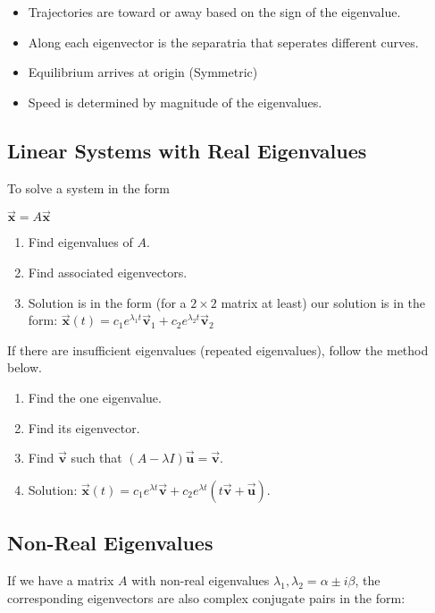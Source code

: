 \documentclass[12pt,landscape,twocolumn]{article}
\let\oldvec\vec
\renewcommand{\vec}[1]{\oldvec{\mathbf{ #1 } } }                    %
\begin{document}
            \begin{itemize}
                \item Trajectories are toward or away based on the sign of the eigenvalue.
                \item Along each eigenvector is the separatria that seperates different curves.
                \item Equilibrium arrives at origin (Symmetric)
                \item Speed is determined by magnitude of the eigenvalues.
            \end{itemize}

    \subsection{Linear Systems with Real Eigenvalues}
    To solve a system in the form

        $
            \vec{x} = A \vec{x}
        $

        \begin{enumerate}
            \item Find eigenvalues of $A$.
            \item Find associated eigenvectors.
            \item Solution is in the form (for a $2\times 2$ matrix at least) our solution is in the form:
                $
                    \vec{x}(t) = c_1 e^{\lambda_1 t} \vec{v}_1 + c_2 e^{\lambda_2 t} \vec{v}_2
                $
        \end{enumerate}

    If there are insufficient eigenvalues (repeated eigenvalues), follow the method below.

        \begin{enumerate}
            \item Find the one eigenvalue.
            \item Find its eigenvector.
            \item Find $\vec{v}$ such that $(A - \lambda I) \vec{u} = \vec{v}$.
            \item Solution: $\vec{x}(t) = c_1 e^{\lambda t} \vec{v} + c_2 e^{\lambda t} (t \vec{v} + \vec{u})$.
        \end{enumerate}

    \subsection{Non-Real Eigenvalues}
    If we have a matrix $A$ with non-real eigenvalues $\lambda_1, \lambda_2 = \alpha \pm i \beta$, the corresponding eigenvectors are also complex conjugate pairs in the form:
\end{document}
